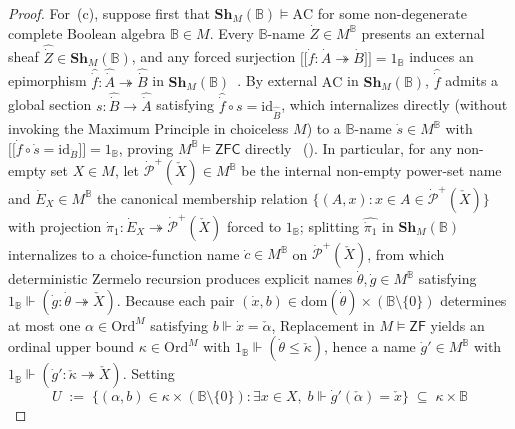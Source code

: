 \documentclass[10pt,twoside,openright]{book}
\providecommand{\llbracket}{\mathopen{[\![}}
\providecommand{\rrbracket}{\mathclose{]\!]}}
\theoremstyle{crmplain}
\theoremstyle{crmdef}
\theoremstyle{crmremark}
\begin{document}
\begin{proof}
For~(c), suppose first that $\mathbf{Sh}_M(\mathbb{B}) \models \mathrm{AC}$ for some non-degenerate complete Boolean algebra $\mathbb{B} \in M$. Every $\mathbb{B}$-name $\dot{Z} \in M^{\mathbb{B}}$ presents an external sheaf $\widehat{\dot{Z}} \in \mathbf{Sh}_M(\mathbb{B})$, and any forced surjection $\llbracket \dot{f} : \dot{A} \twoheadrightarrow \dot{B} \rrbracket = 1_{\mathbb{B}}$ induces an epimorphism $\widehat{\dot{f}} : \widehat{\dot{A}} \twoheadrightarrow \widehat{\dot{B}}$ in $\mathbf{Sh}_M(\mathbb{B})$~\cite{Fourman80}. By external $\mathrm{AC}$ in $\mathbf{Sh}_M(\mathbb{B})$, $\widehat{\dot{f}}$ admits a global section $s : \widehat{\dot{B}} \to \widehat{\dot{A}}$ satisfying $\widehat{\dot{f}} \circ s = \mathrm{id}_{\widehat{\dot{B}}}$, which internalizes directly (without invoking the Maximum Principle in choiceless $M$) to a $\mathbb{B}$-name $\dot{s} \in M^{\mathbb{B}}$ with $\llbracket \dot{f} \circ \dot{s} = \mathrm{id}_{\dot{B}} \rrbracket = 1_{\mathbb{B}}$, proving $M^{\mathbb{B}} \models \mathsf{ZFC}$ directly~\cite{Fourman80} (\cite[\S D4.5]{Johnstone02}). In particular, for any non-empty set $X \in M$, let $\dot{\mathcal{P}}^+(\check{X}) \in M^{\mathbb{B}}$ be the internal non-empty power-set name and $\dot{E}_X \in M^{\mathbb{B}}$ the canonical membership relation $\{(A, x) : x \in A \in \dot{\mathcal{P}}^+(\check{X})\}$ with projection $\dot{\pi}_1 : \dot{E}_X \twoheadrightarrow \dot{\mathcal{P}}^+(\check{X})$ forced to $1_{\mathbb{B}}$; splitting $\widehat{\dot{\pi}_1}$ in $\mathbf{Sh}_M(\mathbb{B})$ internalizes to a choice-function name $\dot{c} \in M^{\mathbb{B}}$ on $\dot{\mathcal{P}}^+(\check{X})$, from which deterministic Zermelo recursion produces explicit names $\dot{\theta}, \dot{g} \in M^{\mathbb{B}}$ satisfying $1_{\mathbb{B}} \Vdash (\dot{g} : \dot{\theta} \twoheadrightarrow \check{X})$. Because each pair $(\dot{x}, b) \in \mathrm{dom}(\dot{\theta}) \times (\mathbb{B}\setminus\{0\})$ determines at most one $\alpha \in \mathrm{Ord}^M$ satisfying $b \Vdash \dot{x} = \check{\alpha}$, Replacement in $M \models \mathsf{ZF}$ yields an ordinal upper bound $\kappa \in \mathrm{Ord}^M$ with $1_{\mathbb{B}} \Vdash (\dot{\theta} \le \check{\kappa})$, hence a name $\dot{g}' \in M^{\mathbb{B}}$ with $1_{\mathbb{B}} \Vdash (\dot{g}' : \check{\kappa} \twoheadrightarrow \check{X})$. Setting
\[
  U \;:=\; \bigl\{(\alpha, b) \in \kappa \times (\mathbb{B}\setminus\{0\}) : \exists x \in X,\; b \Vdash \dot{g}'(\check{\alpha}) = \check{x}\bigr\} \;\subseteq\; \kappa \times \mathbb{B}
\]

\end{proof}
\end{document}
